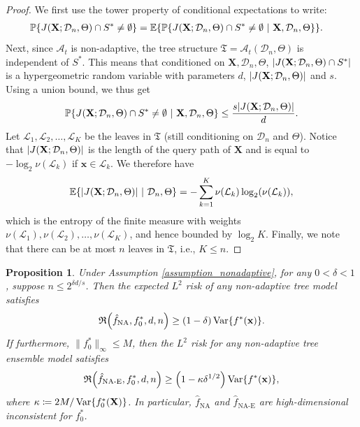 \documentclass[11pt]{article}
\newtheorem{proposition}[theorem]{Proposition}
\newcommand{\bx}{\mathbf{x}}
\newcommand{\bX}{\mathbf{X}}
\DeclarePairedDelimiter{\braces}{\lbrace}{\rbrace}
\DeclarePairedDelimiter{\paren}{(}{)}
\DeclarePairedDelimiter{\abs}{|}{|}
\renewcommand{\P}{\mathbb{P}}
\newcommand{\E}{\mathbb{E}}
\newcommand{\Var}{\operatorname{Var}}
\newcommand{\tree}{\mathfrak{T}}
\newcommand{\leaf}{\mathcal{L}}
\newcommand{\xmeasure}{\nu}
\newcommand{\sparsity}{s}
\newcommand{\nfeats}{d}
\newcommand{\nsamples}{n}
\newcommand{\data}[1][n]{\mathcal{D}_{#1}}
\newcommand{\suppset}{S^*}
\newcommand{\fna}{\hat{f}_{\operatorname{NA}}}
\newcommand{\alg}{\mathcal{A}}
\newcommand{\objective}{\mathfrak{R}}
\newcommand{\fnae}{\hat f_{\operatorname{NA-E}}}
\newcommand{\ybound}{M}
\begin{document}
\begin{proof}
    We first use the tower property of conditional expectations to write:
    \begin{equation}
        \begin{split}
            \P\braces*{J(\bX;\data,\Theta)\cap \suppset \neq \emptyset } & = \E\braces*{\P\braces*{J(\bX;\data,\Theta)\cap \suppset \neq \emptyset ~|~\bX,\data,\Theta}}.
        \end{split}
    \end{equation}
    Next, since $\alg_t$ is non-adaptive, the tree structure $\tree = \alg_t(\data,\Theta)$ is independent of $\suppset$.
    This means that conditioned on $\bX,\data,\Theta$, $\abs*{J(\bX;\data,\Theta)\cap \suppset}$ is a hypergeometric random variable with parameters $\nfeats$, $\abs*{J(\bX;\data,\Theta)}$ and $\sparsity$.
    Using a union bound, we thus get
    \begin{equation}
        \P\braces*{J(\bX;\data,\Theta)\cap \suppset \neq \emptyset ~|~\bX,\data,\Theta} \leq \frac{\sparsity \abs*{J(\bX;\data,\Theta)}}{\nfeats}.
    \end{equation}
    Let $\leaf_1,\leaf_2,\ldots,\leaf_K$ be the leaves in $\tree$ (still conditioning on $\data$ and $\Theta$).
    Notice that $\abs*{J(\bX;\data,\Theta)}$ is the length of the query path of $\bX$ and is equal to $-\log_2 \xmeasure(\leaf_k)$ if $\bx \in \leaf_k$. 
    We therefore have
    \begin{equation}
        \E\braces*{\abs*{J(\bX;\data,\Theta)}~|~\data,\Theta} = -\sum_{k=1}^K \xmeasure(\leaf_k) \log_2(\xmeasure(\leaf_k)),
    \end{equation}
    which is the entropy of the finite measure with weights $\xmeasure(\leaf_1),\xmeasure(\leaf_2),\ldots,\xmeasure(\leaf_K)$, and hence bounded by $\log_2 K$.
    Finally, we note that there can be at most $\nsamples$ leaves in $\tree$, i.e., $K \leq \nsamples$.
\end{proof}

\begin{proposition}
    \label{prop:na_lower_bound}
    Under Assumption \ref{assumption_nonadaptive}, for any $0 < \delta < 1$,
    suppose $\nsamples \leq 2^{\delta\nfeats/\sparsity}$.
    Then the expected $L^2$ risk of any non-adaptive tree model satisfies
    \begin{equation}
        \label{eq:na_tree_lower_bound}
        \objective\paren*{\fna, f^*_0,\nfeats,\nsamples} \geq (1-\delta)\Var\braces*{f^*(\bx)}.
    \end{equation}
    If furthermore, $\|f^*_0\|_{\infty} \leq \ybound$, then the $L^2$ risk for any non-adaptive tree ensemble model satisfies
    \begin{equation}
        \label{eq:na_ensemble_lower_bound}
        \objective\paren*{\fnae, f^*_0,\nfeats,\nsamples} \geq \paren*{1-\kappa\delta^{1/2}}\Var\braces*{f^*(\bx)},
    \end{equation}
    where $\kappa \coloneqq 2\ybound/\Var\braces*{f_0^*(\bX)}$.
    In particular, $\fna$ and $\fnae$ are high-dimensional inconsistent for $f^*_0$.
\end{proposition}
\end{document}
